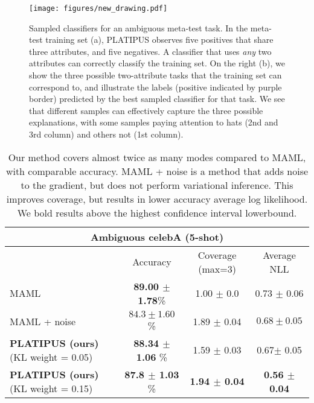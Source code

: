 \documentclass{article}
\begin{document}
\begin{figure*}[t] \centering
\texttt{[image: figures/new\_drawing.pdf]}
    \vspace{-0.2cm}
    \caption{\small Sampled classifiers for an ambiguous meta-test task. In the meta-test training set (a), PLATIPUS observes five positives that share three attributes, and five negatives. A classifier that uses \emph{any} two attributes can correctly classify the training set. On the right (b), we show the three possible two-attribute tasks that the training set can correspond to, and illustrate the labels (positive indicated by purple border) predicted by the best sampled classifier for that task. We see that different samples can effectively capture the three possible explanations, with some samples paying attention to hats  (2nd and 3rd column) and others not (1st column).
\label{fig:celeb_a}
    \vspace{-0.1in}
    }
\end{figure*}


\begin{table*}[!h]
\label{tbl:celeba}
\begin{center}
{\footnotesize
\begin{tabular}{|l|c|c|c|}
\hline
\multicolumn{4}{|c|}{Ambiguous celebA (5-shot)} 
\\
\hline
&  Accuracy & Coverage (max=3) & Average NLL \\
\hline
MAML  & \textbf{89.00 $\pm$ 1.78}\%  & 1.00 $\pm$ 0.0 & 0.73 $\pm$ 0.06\\
\hline
MAML + noise & $84.3 \pm 1.60$  \%  & 1.89 $\pm$ 0.04  &  $0.68 \pm 0.05$ \\
\hline
\textbf{PLATIPUS (ours)} (KL weight = 0.05)& \textbf{88.34 $\pm$ 1.06} \% & 1.59  $\pm$ 0.03 & 0.67$\pm$ 0.05 \\
\hline
\textbf{PLATIPUS (ours)} (KL weight = 0.15) & \textbf{87.8 $\pm$ 1.03} \% & \textbf{1.94  $\pm$ 0.04} & \textbf{0.56 $\pm$ 0.04}\\
\hline
\end{tabular}
}
\end{center}
\vspace{-0.35cm}
\caption{ Our method covers almost twice as many modes compared to MAML, with comparable accuracy. 
MAML + noise is a method that adds noise to the gradient, but does not perform variational inference. This improves coverage, but results in lower accuracy average log likelihood. We bold results above the highest confidence interval lowerbound.
}
\vspace{-0.5cm}
\end{table*}
 
\end{document}
